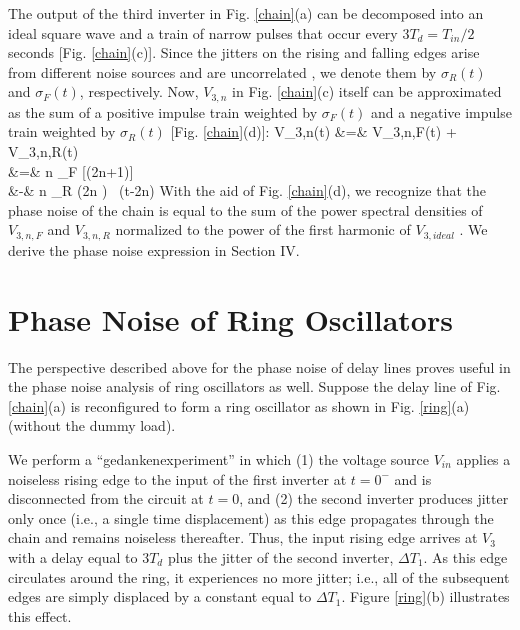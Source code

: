 The output of the third inverter in Fig. \ref{chain}(a) can be decomposed into an ideal square wave and a train of narrow pulses \cite{Perrott,Galton} that occur every $3 T_d=T_{in}/2$
seconds [Fig. \ref{chain}(c)]. Since the jitters on the rising and falling edges arise from different noise sources and are
uncorrelated \cite{Homayoun}, we denote them by $\sigma_R(t)$ and $\sigma_F(t)$, respectively. Now, $V_{3,n}$ in Fig. \ref{chain}(c) itself can be approximated as the
sum of a positive impulse train weighted by $\sigma_F(t)$ and a negative impulse train weighted by $\sigma_R(t)$ [Fig. \ref{chain}(d)]: 
\ber
V_{3,n}(t) &=& V_{3,n,F}(t) + V_{3,n,R}(t) \nonumber\\
&=& \SumAll n \sigma_F [(2n+1)] ~\delta [t-(2n+1)\frac{T_{in}}{2}] \nonumber\\
&-& \SumAll n \sigma_R (2n ) ~\delta (t-2n)
\label{v3n}
\eer
With the aid of Fig. \ref{chain}(d), we recognize that 
the phase noise of the chain is equal to the sum of the power spectral densities of $V_{3,n,F}$ and $V_{3,n,R}$ normalized to the power of the first
harmonic of $V_{3,ideal}$ \cite{Homayoun}. We derive the phase noise expression in Section IV.


 
\section{Phase Noise of Ring Oscillators}

The perspective described above for the phase noise of delay lines proves useful in the phase noise analysis of ring oscillators as well. Suppose the delay line of
Fig. \ref{chain}(a) is reconfigured to form a ring oscillator as shown in Fig. \ref{ring}(a) (without the dummy load).  

 
We perform a ``gedankenexperiment'' in which (1) the voltage source $V_{in}$ applies a noiseless rising edge to the input of the first inverter at $t=0^-$ and is
disconnected from the circuit at $t=0$, and (2) the second inverter produces jitter only once (i.e., a single time displacement) as this edge propagates through the chain and remains noiseless
thereafter. Thus, the input rising edge arrives at $V_3$ with a delay equal to $3T_d$ plus the jitter of the second inverter, $\Delta T_1$. As this edge circulates
around the ring, it experiences no more jitter; i.e., all of the subsequent edges are simply displaced by a constant equal to $\Delta T_1$. Figure \ref{ring}(b)
illustrates this effect.

